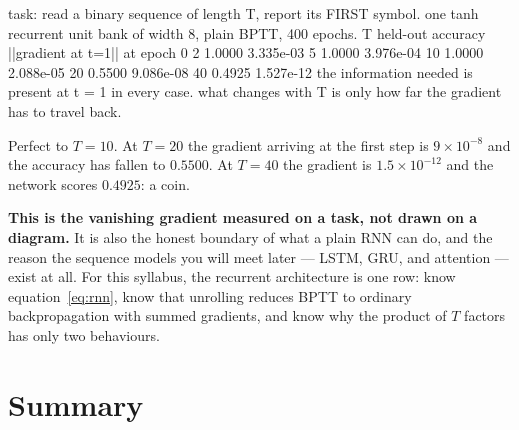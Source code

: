 \documentclass[11pt]{article}
\begin{document}
\begin{codeout}
task: read a binary sequence of length T, report its FIRST symbol.
one tanh recurrent unit bank of width 8, plain BPTT, 400 epochs.
      T   held-out accuracy   ||gradient at t=1|| at epoch 0
      2       1.0000              3.335e-03
      5       1.0000              3.976e-04
     10       1.0000              2.088e-05
     20       0.5500              9.086e-08
     40       0.4925              1.527e-12
the information needed is present at t = 1 in every case.
what changes with T is only how far the gradient has to travel back.
\end{codeout}

Perfect to $T = 10$. At $T = 20$ the gradient arriving at the first step is
$9\times10^{-8}$ and the accuracy has fallen to $0.5500$. At $T = 40$ the
gradient is $1.5\times10^{-12}$ and the network scores $\mathbf{0.4925}$: a
coin.

\textbf{This is the vanishing gradient measured on a task, not drawn on a
diagram.} It is also the honest boundary of what a plain RNN can do, and the
reason the sequence models you will meet later --- LSTM, GRU, and attention
--- exist at all. For this syllabus, the recurrent architecture is one row:
know equation~\eqref{eq:rnn}, know that unrolling reduces BPTT to ordinary
backpropagation with summed gradients, and know why the product of $T$ factors
has only two behaviours.

\section{Summary}
\label{sec:summary}
\end{document}
